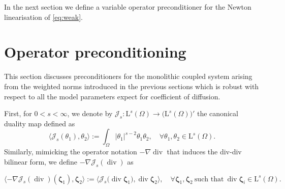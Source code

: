 \documentclass[11pt, reqno, a4paper, twoside]{article}
\newcommand\bzeta{\boldsymbol{\zeta}}
\newcommand{\rL}{\mathrm{L}}
\newcommand\vdiv{\mathop{\mathrm{div}}\nolimits}
\numberwithin{equation}{section}
\numberwithin{remark}{section}
\numberwithin{figure}{section}
\numberwithin{table}{section}
\begin{document}
{ In the next section we define a variable operator preconditioner for the Newton linearisation of  \eqref{eq:weak}. 
\section{Operator preconditioning}\label{sec:precond}
This section discusses preconditioners for the monolithic coupled system arising from the weighted norms introduced in the previous sections which is robust with respect to all the model parameters expect for coefficient of diffusion.

First, for \(0<s<\infty\), we denote by \(\mathcal{J}_s:\rL^s(\Omega)\to\bigl(\rL^s(\Omega)\bigr)'\)  the canonical duality map defined as 
\begin{equation}
\langle{\mathcal{J}}_s(\theta_1),\theta_2\rangle:=\int_{\Omega}|\theta_1|^{s-2}\theta_1\theta_2,\quad\forall\theta_1,\theta_2\in\rL^s(\Omega).\end{equation}
Similarly, mimicking the operator notation $-\nabla \vdiv$ that induces the div-div bilinear form, we define $-\nabla \mathcal{J}_{s}(\vdiv)$ as}
\begin{equation}\label{eq:duality2} {\langle-\nabla \mathcal{J}_{s}(\vdiv)(\bzeta_1),\bzeta_2\rangle:={\langle} \mathcal{J}_{s}(\vdiv\bzeta_1{),\vdiv\bzeta_2\rangle},\quad \forall \bzeta_1,\bzeta_2 \ \text{such that} \ \vdiv\bzeta_i \in \rL^s(\Omega).}\end{equation}
\end{document}
